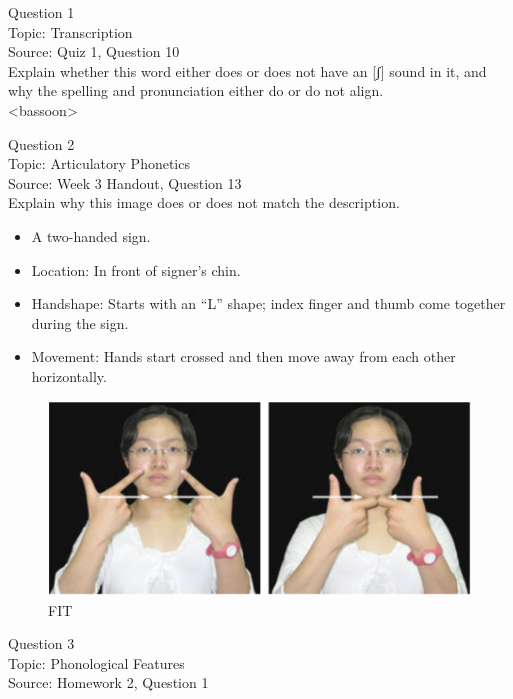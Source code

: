 \documentclass[12pt]{article}
\begin{document}
{\large Question 1}\\

Topic: Transcription\\
Source: Quiz 1, Question 10\\

Explain whether this word either does or does not have an [ʃ] sound in it, and why the spelling and pronunciation either do or do not align.\\

<bassoon>


\newpage

{\large Question 2}\\

Topic: Articulatory Phonetics\\
Source: Week 3 Handout, Question 13\\

Explain why this image does or does not match the description.\\

\begin{itemize} \item A two-handed sign. \item Location: In front of signer’s chin. \item Handshape: Starts with an “L” shape; index finger and thumb come together during the sign. \item Movement: Hands start crossed and then move away from each other horizontally. \end{itemize}

\begin{figure}[H]
\includegraphics{../images/taiwansign_fit.png}
\caption{FIT}
\end{figure}

\newpage

{\large Question 3}\\

Topic: Phonological Features\\
Source: Homework 2, Question 1\\
\end{document}
